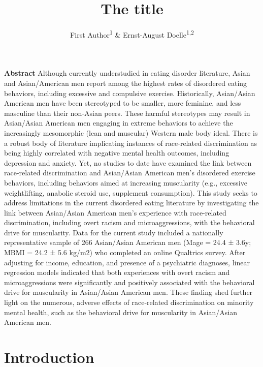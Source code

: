 \documentclass[
  english,
  man, fleqn, noextraspace,floatsintext]{apa6}
\title{The title}
\author{First Author\textsuperscript{1} \& Ernst-August Doelle\textsuperscript{1,2}}
\date{}
\affiliation{\vspace{0.5cm}\textsuperscript{1} Wilhelm-Wundt-University}
\begin{document}
\maketitle

\textbf{Abstract}
Although currently understudied in eating disorder literature, Asian and Asian/American men report among the highest rates of disordered eating behaviors, including excessive and compulsive exercise. Historically, Asian/Asian American men have been stereotyped to be smaller, more feminine, and less masculine than their non-Asian peers. These harmful stereotypes may result in Asian/Asian American men engaging in extreme behaviors to achieve the increasingly mesomorphic (lean and muscular) Western male body ideal. There is a robust body of literature implicating instances of race-related discrimination as being highly correlated with negative mental health outcomes, including depression and anxiety. Yet, no studies to date have examined the link between race-related discrimination and Asian/Asian American men's disordered exercise behaviors, including behaviors aimed at increasing muscularity (e.g., excessive weightlifting, anabolic steroid use, supplement consumption). This study seeks to address limitations in the current disordered eating literature by investigating the link between Asian/Asian American men's experience with race-related discrimination, including overt racism and microaggressions, with the behavioral drive for muscularity. Data for the current study included a nationally representative sample of 266 Asian/Asian American men (Mage = 24.4 ± 3.6y; MBMI = 24.2 ± 5.6 kg/m2) who completed an online Qualtrics survey. After adjusting for income, education, and presence of a psychiatric diagnoses, linear regression models indicated that both experiences with overt racism and microaggressions were significantly and positively associated with the behavioral drive for muscularity in Asian/Asian American men. These finding shed further light on the numerous, adverse effects of race-related discrimination on minority mental health, such as the behavioral drive for muscularity in Asian/Asian American men.

\hypertarget{introduction}{%
\section{\texorpdfstring{\textbf{Introduction}}{Introduction}}\label{introduction}}
\end{document}
